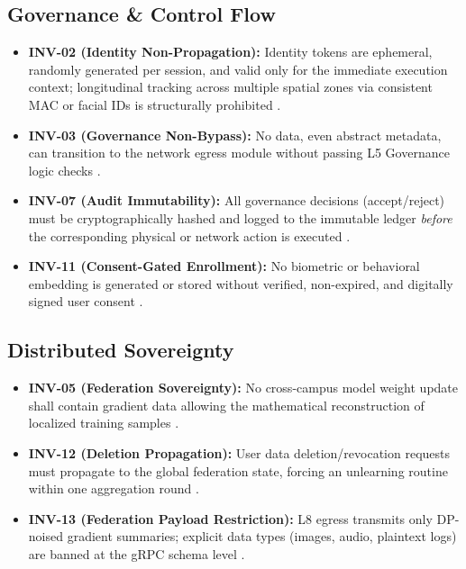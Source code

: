 \documentclass[conference]{IEEEtran}
\theoremstyle{definition}
\begin{document}
\subsection{Governance \& Control Flow}
\begin{itemize}
    \item \textbf{INV-02 (Identity Non-Propagation):} Identity tokens are ephemeral, randomly generated per session, and valid only for the immediate execution context; longitudinal tracking across multiple spatial zones via consistent MAC or facial IDs is structurally prohibited \cite{P1, P3, P9}.
    \item \textbf{INV-03 (Governance Non-Bypass):} No data, even abstract metadata, can transition to the network egress module without passing L5 Governance logic checks \cite{P9}.
    \item \textbf{INV-07 (Audit Immutability):} All governance decisions (accept/reject) must be cryptographically hashed and logged to the immutable ledger \textit{before} the corresponding physical or network action is executed \cite{P8}.
    \item \textbf{INV-11 (Consent-Gated Enrollment):} No biometric or behavioral embedding is generated or stored without verified, non-expired, and digitally signed user consent \cite{P8}.
\end{itemize}

\subsection{Distributed Sovereignty}
\begin{itemize}
    \item \textbf{INV-05 (Federation Sovereignty):} No cross-campus model weight update shall contain gradient data allowing the mathematical reconstruction of localized training samples \cite{P14}.
    \item \textbf{INV-12 (Deletion Propagation):} User data deletion/revocation requests must propagate to the global federation state, forcing an unlearning routine within one aggregation round \cite{P14}.
    \item \textbf{INV-13 (Federation Payload Restriction):} L8 egress transmits only DP-noised gradient summaries; explicit data types (images, audio, plaintext logs) are banned at the gRPC schema level \cite{P13}.
\end{itemize}
\end{document}

